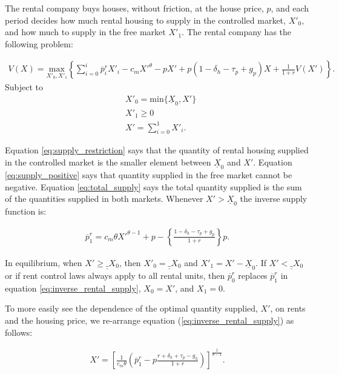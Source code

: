 \documentclass[parskip=full]{article}
\begin{document}
The rental company buys houses, without friction, at the house price, $p$, and each period decides how much rental housing to supply in the controlled market, $X'_{0}$, and how much to supply in the free market $X'_{1}$. The rental company has the following problem:

\begin{align}\label{eq:rental_company_problem}
V(X)=\underset{X'_{0},X'_{1}} {\text{$\mbox{max} $}}\left\{\sum_{i=0}^{i} \overline{p}^{r}_{i}X'_{i}-c_{m}X'^{\theta}-p X'+p(1-\delta_{h}-\tau_{p}+g_{p})X+\frac{1}{1+r}V(X')\right\}.
\end{align}
Subject to
\begin{align}
& X'_{0}=\mbox{min}\{\underline{X}_{0},X'\} \label{eq:supply_restriction} \\
& X'_{1} \geq 0 \label{eq:supply_positive} \\
& X'=\sum^{1}_{i=0} X'_{i}. \label{eq:total_supply} 
\end{align}

\noindent Equation \ref{eq:supply_restriction} says that the quantity of rental housing supplied in the controlled market is the smaller element between $\underline{X}_{0}$ and $X'$. Equation \ref{eq:supply_positive} says that quantity supplied in the free market cannot be negative. Equation \ref{eq:total_supply} says the total quantity supplied is the sum of the quantities supplied in both markets. Whenever $X'>\underline{X}_{0}$ the inverse supply function is:

\begin{align}\label{eq:inverse_rental_supply}
\overline{p}^{r}_{1}=c_{m}\theta X'^{\theta-1}+p-\left\{\frac{1-\delta_{h}-\tau_p+g_{p}}{1+r}\right\}p.
\end{align}

\noindent In equilibrium, when $X'\geq \underline_{X}_{0}$, then $X'_{0}=\underline_{X}_{0}$ and $X'_{1}=X'-\underline{X}_{0}$. If $X'<\underline_{X}_{0}$ or if rent control laws always apply to all rental units, then $\overline{p}^{r}_{0}$ replaces $\overline{p}^{r}_{1}$ in equation \ref{eq:inverse_rental_supply}, $X_{0}=X'$, and $X_{1}=0$.

To more easily see the dependence of the optimal quantity supplied, $X'$, on rents and the housing price, we re-arrange equation (\ref{eq:inverse_rental_supply}) as follows:

\begin{align}\label{eq:rental_supply}
X'=\left[\frac{1}{c_{m}\theta}\left(\overline{p}^{r}_{1}-p\frac{r+\delta_{h}+\tau_{p}-g_{h}}{1+r}\right)\right]^{\frac{1}{\theta-1}}.
\end{align}
\end{document}
